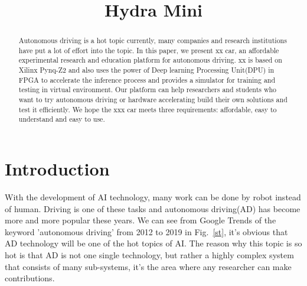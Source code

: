 \documentclass[conference]{IEEEtran}
\begin{document}
\begin{sloppypar}
\title{Hydra Mini}

\author{
}
\maketitle

\begin{abstract}
Autonomous driving is a hot topic currently, many companies and research institutions have put a lot of effort into the topic. In this paper, we present xx car, an affordable experimental research and education platform for autonomous driving. xx is based on Xilinx Pynq-Z2 and also uses the power of Deep learning Processing Unit(DPU) in FPGA to accelerate the inference process and provides a simulator for training and testing in virtual environment. Our platform can help researchers and students who want to try autonomous driving or hardware accelerating build their own solutions and test it efficiently. We hope the xxx car meets three requirements: affordable, easy to understand and easy to use. 
\end{abstract}


\section{Introduction}
With the development of AI technology, many work can be done by robot instead of human. Driving is one of these tasks and autonomous driving(AD) has become more and more popular these years. We can see from Google Trends of the keyword 'autonomous driving' from 2012 to 2019 in Fig.~\ref{st}, it's obvious that AD technology will be one of the hot topics of AI. The reason why this topic is so hot is that AD is not one single technology, but rather a highly complex system that consists of many sub-systems\cite{b1}, it's the area where any researcher can make contributions.


\end{sloppypar}
\end{document}
